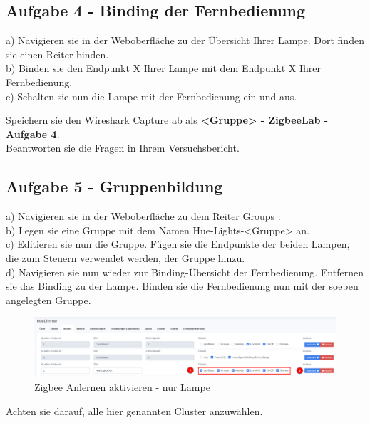 \subsection{Aufgabe 4 - Binding der Fernbedienung}

a) Navigieren sie in der Weboberfläche zu der Übersicht Ihrer Lampe. Dort finden sie einen Reiter \grqq binden\grqq{}. \\
b) Binden sie den Endpunkt X Ihrer Lampe mit dem Endpunkt X Ihrer Fernbedienung. \\
c) Schalten sie nun die Lampe mit der Fernbedienung ein und aus. 

\begin{Hinweis}
    Speichern sie den Wireshark Capture ab als \textbf{\grqq <Gruppe> - ZigbeeLab - Aufgabe 4\grqq{}}. \\
    Beantworten sie die Fragen in Ihrem Versuchsbericht.
\end{Hinweis}



\subsection{Aufgabe 5 - Gruppenbildung}

a) Navigieren sie in der Weboberfläche zu dem Reiter \grqq Groups \grqq{}. \\
b) Legen sie eine Gruppe mit dem Namen \grqq Hue-Lights-<Gruppe> \grqq{} an.\\
c) Editieren sie nun die Gruppe. Fügen sie die Endpunkte der beiden Lampen, die zum Steuern verwendet werden, der Gruppe hinzu. \\
d) Navigieren sie nun wieder zur Binding-Übersicht der Fernbedienung. Entfernen sie das Binding zu der Lampe. Binden sie die Fernbedienung nun mit der soeben
angelegten Gruppe.

\begin{figure}[H]
    \centering
    \includegraphics[width=1\textwidth]{media/Z2M-Group-Binding.png}
    \caption{Zigbee Anlernen aktivieren - nur Lampe}
\end{figure}

Achten sie darauf, alle hier genannten Cluster anzuwählen.

